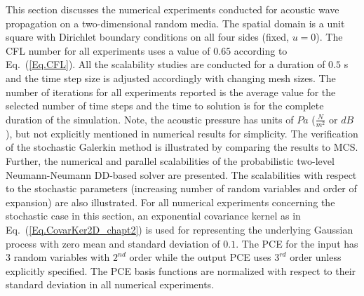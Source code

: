 \documentclass{article}
\begin{document}
This section discusses the numerical experiments conducted for acoustic wave propagation on a two-dimensional random media. The spatial domain is a unit square with Dirichlet boundary conditions on all four sides (fixed, $u = 0$). The CFL number for all experiments uses a value of $0.65$ according to Eq.~(\ref{Eq.CFL}). All the scalability studies are conducted for a duration of $0.5$ s and the time step size is adjusted accordingly with changing mesh sizes.
The number of iterations for all experiments reported is the average value for the selected number of time steps and the time to solution is for the complete duration of the simulation. Note, the acoustic pressure has units of $Pa$ ($\frac{N}{m^2}$ or $dB$), but not explicitly mentioned in numerical results for simplicity. The verification of the stochastic Galerkin method is illustrated by comparing the results to MCS. Further, the numerical and parallel scalabilities of the probabilistic two-level Neumann-Neumann DD-based solver are presented. The scalabilities with respect to the stochastic parameters (increasing number of random variables and order of expansion) are also illustrated. For all numerical experiments concerning the stochastic case in this section, an exponential covariance kernel as in Eq.~(\ref{Eq.CovarKer2D_chapt2}) is used for representing the underlying Gaussian process with zero mean and standard deviation of $0.1$. The PCE for the input has $3$ random variables with $2^{nd}$ order while the output PCE uses $3^{rd}$ order unless explicitly specified. The PCE basis functions are normalized with respect to their standard deviation in all numerical experiments.
\end{document}
